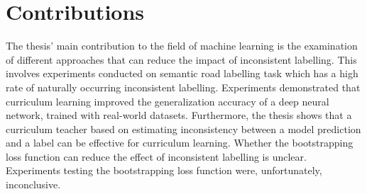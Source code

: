 \section{Contributions}
\label{sec:IntroContributions}
The thesis' main contribution to the field of machine learning  is the examination of different approaches that can reduce the impact of inconsistent labelling. This involves experiments conducted on semantic road labelling task which has a high rate of naturally occurring inconsistent labelling. Experiments demonstrated that curriculum learning improved the generalization accuracy of a deep neural network, trained with real-world datasets. Furthermore, the thesis shows that a curriculum teacher based on estimating inconsistency between a model prediction and a label can be effective for curriculum learning. Whether the bootstrapping loss function can reduce the effect of inconsistent labelling is unclear. Experiments testing the bootstrapping loss function were, unfortunately, inconclusive.